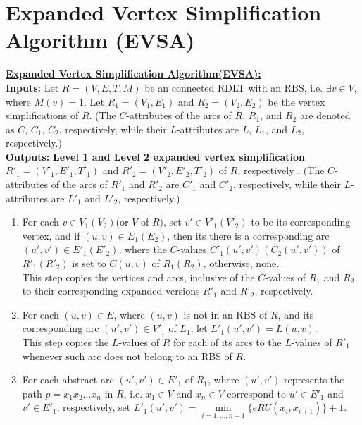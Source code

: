 \section*{ Expanded Vertex Simplification Algorithm (EVSA)}
\begin{algorithm}
    \label{EVSA}
    \underline{\textbf{Expanded Vertex Simplification Algorithm(EVSA):}}\\
    \textbf{Inputs:} Let $R = (V, E, T, M)$ be an connected RDLT with an RBS, i.e. $\exists v \in V$, where $M(v) = 1$. Let $R_1 = (V_1, E_1)$ and $R_2 = (V_2, E_2)$ be the vertex simplifications of $R$. (The $C$-attributes of the arcs of $R$, $R_1$, and $R_2$ are denoted as $C$, $C_1$, $C_2$, respectively, while their $L$-attributes are $L$, $L_1$, and $L_2$, respectively.) \\

    \noindent
    \textbf{Outputs:} \textbf{Level 1 and Level 2 expanded vertex simplification} $R'_1 = (V'_1, E'_1, T'_1)$ and $R'_2 = (V'_2, E'_2, T'_2)$ of $R$, respectively . (The $C$-attributes of the arcs of $R'_1$ and $R'_2$ are $C'_1$ and $C'_2$, respectively, while their $L$-attributes are $L'_1$ and $L'_2$, respectively.)

    \begin{enumerate}
        \item For each $v \in V_1(V_2)$(or $V$ of $R$), set $v' \in V'_1(V'_2)$ to be its corresponding vertex, and if $(u,v) \in E_1(E_2)$, then its there is a corresponding arc $(u',v') \in E'_1(E'_2)$, where the $C$-values $C'_1(u',v')(C_2(u',v'))$ of $R'_1(R'_2)$ is set to $C(u,v)$ of $R_1(R_2)$, otherwise, none.  \\

        This step copies the vertices and arcs, inclusive of the $C$-values of $R_1$ and $R_2$ to their corresponding expanded versions $R'_1$ and $R'_2$, respectively. 

        \item For each $(u,v) \in E$, where $(u,v)$ is not in an RBS of $R$, and its corresponding arc $(u',v') \in V'_1$ of $L_1$, let $L'_1(u',v') = L(u,v)$. \\

        This step copies the $L$-values of $R$ for each of its arcs to the $L$-values of $R'_1$ whenever such arc does not belong to an RBS of $R$. 
        
        \item For each abstract arc $(u',v') \in E'_1$ of $R_1$, where $(u',v')$ represents the path \mbox{$p = x_1 x_2 \ldots x_n$} in $R$, i.e. $x_1 \in V$ and $x_n \in V$ correspond to $u' \in E'_1$ and  $v' \in E'_1$, respectively, set $L'_1(u',v') = \min\limits_{i = 1, \ldots, n-1} \{eRU(x_i, x_{i+1})\} + 1$. \\
        

\end{enumerate}
\end{algorithm}
